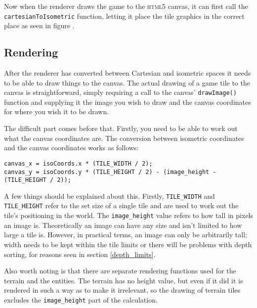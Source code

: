 Now when the renderer draws the game to the \textsc{html5} canvas, it can first call the \texttt{cartesianToIsometric} function, letting it place the tile graphics in the correct place as seen in figure .

\subsection{Rendering}
After the renderer has converted between Cartesian and isometric spaces it needs to be able to draw things to the canvas. The actual drawing of a game tile to the canvas is straightforward, simply requiring a call to the canvas' \texttt{drawImage()} function and supplying it the image you wish to draw and the canvas coordinates for where you wish it to be drawn.

The difficult part comes before that. Firstly, you need to be able to work out what the canvas coordinates are. The conversion between isometric coordinates and the canvas coordinates works as follows:

\noindent
\begin{minipage}{\linewidth}
\begin{lstlisting}[style=js, caption={Conversion between isometric coordinates and canvas coordinates.}, label=isometric_to_canvas]
canvas_x = isoCoords.x * (TILE_WIDTH / 2);
canvas_y = isoCoords.y * (TILE_HEIGHT / 2) - (image_height - (TILE_HEIGHT / 2));
\end{lstlisting}
\end{minipage}

A few things should be explained about this. Firstly, \texttt{TILE\_WIDTH} and \texttt{TILE\_HEIGHT} refer to the set size of a single tile and are used to work out the tile's positioning in the world. The \texttt{image\_height} value refers to how tall in pixels an image is. Theoretically an image can have any size and isn't limited to how large a tile is. However, in practical terms, an image can only be arbitrarily tall; width needs to be kept within the tile limits or there will be problems with depth sorting, for reasons seen in section \ref{depth_limits}.


Also worth noting is that there are separate rendering functions used for the terrain and the entities. The terrain has no height value, but even if it did it is rendered in such a way as to make it irrelevant, so the drawing of terrain tiles excludes the \texttt{image\_height} part of the calculation.

